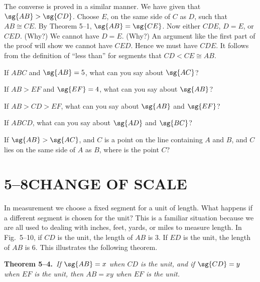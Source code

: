 \documentclass[11pt]{book}
\theoremstyle{bkplain}
\theoremstyle{XIplainnote}
\theoremstyle{bkplain}
\theoremstyle{bkplain}
\begin{document}
\FIGVNINE

The converse is proved in a similar manner. We have given that
$\sg{AB} > \sg{CD}$. Choose $E$, on the same side of $C$ as $D$, such that
$AB \cong CE$. By Theorem 5--1, $\sg{AB} = \sg{CE}$. Now either $CDE$,
$D = E$, or $CED$. (Why?) We cannot have $D = E$. (Why?) An argument like the
first part of the proof will show we cannot have $CED$. Hence we must have
$CDE$. It follows from the definition of ``less than'' for segments that
$CD < CE \cong AB$.


\begin{exercisecols}
\begin{exlist}
\item If $ABC$ and $\sg{AB} = 5$, what can you say about $\sg{AC}$?
\item If $AB > EF$ and $\sg{EF} = 4$, what can you say about $\sg{AB}$?
\item If $AB > CD > EF$, what can you say about $\sg{AB}$ and $\sg{EF}$?
\item If $ABCD$, what can you say about $\sg{AD}$ and $\sg{BC}$?
\item If $\sg{AB} > \sg{AC}$, and $C$ is a point on the line containing $A$ and
      $B$, and $C$ lies on the same side of $A$ as $B$, where is the point $C$?
\end{exlist}
\end{exercisecols}

\section*{5--8\quad CHANGE OF SCALE}

In measurement we choose a fixed segment for a unit of length. What happens if
a different segment is chosen for the unit? This is a familiar situation
because we are all used to dealing with inches, feet, yards, or miles to
measure length. In Fig.~5--10, if $CD$ is the unit, the length of $AB$ is 3. If
$ED$ is the unit, the length of $AB$ is 6. This illustrates the following
theorem.

\FIGVTEN

\medskip\noindent
\textbf{Theorem 5--4.}\ \emph{If $\sg{AB} = x$ when $CD$ is the unit, and if
$\sg{CD} = y$ when $EF$ is the unit, then $AB = xy$ when $EF$ is the unit.}
\par\medskip
\end{document}
